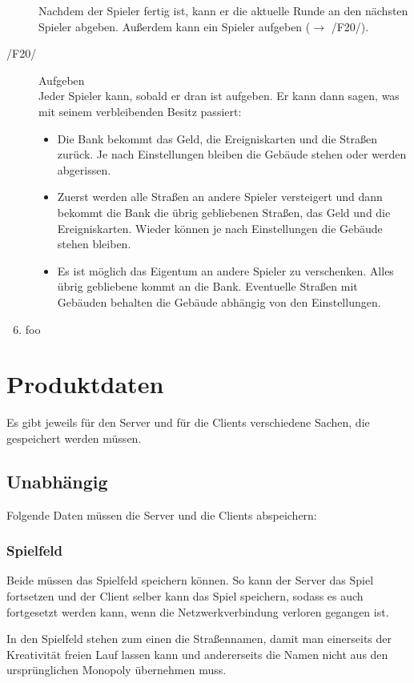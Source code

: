 \documentclass[a4paper,10pt]{article}
\begin{document}
\begin{description}
Nachdem der Spieler fertig ist, kann er die aktuelle Runde an den nächsten Spieler abgeben. Außerdem kann ein Spieler aufgeben ($\rightarrow$ /F20/).
\item[/F20/] Aufgeben \\
Jeder Spieler kann, sobald er dran ist aufgeben. Er kann dann sagen, was mit seinem verbleibenden Besitz passiert:
\begin{itemize}
\item Die Bank bekommt das Geld, die Ereigniskarten und die Straßen zurück. Je nach Einstellungen bleiben die Gebäude stehen oder werden abgerissen.
\item Zuerst werden alle Straßen an andere Spieler versteigert und dann bekommt die Bank die übrig gebliebenen Straßen, das Geld und die Ereigniskarten. Wieder können je nach Einstellungen die Gebäude stehen bleiben.
\item Es ist möglich das Eigentum an andere Spieler zu verschenken. Alles übrig gebliebene kommt an die Bank. Eventuelle Straßen mit Gebäuden behalten die Gebäude abhängig von den Einstellungen.
\end{itemize}
\end{description}

\begin{enumerate}[/F1/]
\setcounter{enumi}{5}
\item foo
\end{enumerate}
\section{Produktdaten}
Es gibt jeweils für den Server und für die Clients verschiedene Sachen, die gespeichert werden müssen.
\subsection{Unabhängig}
Folgende Daten müssen die Server und die Clients abspeichern:
\subsubsection{Spielfeld}
Beide müssen das Spielfeld speichern können. So kann der Server das Spiel fortsetzen und der Client selber kann das Spiel speichern, sodass es auch fortgesetzt werden kann, wenn die Netzwerkverbindung verloren gegangen ist.

In den Spielfeld stehen zum einen die Straßennamen, damit man einerseits der Kreativität freien Lauf lassen kann und andererseits die Namen nicht aus den ursprünglichen Monopoly übernehmen muss.
\end{document}
